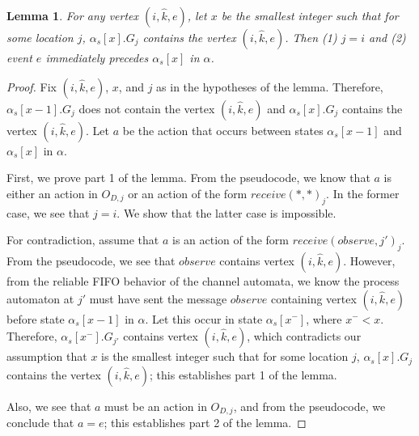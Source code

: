 \documentclass[11pt]{article}
\numberwithin{theorem}{section}
\newtheorem{lemma}[theorem]{Lemma}
\begin{document}
\begin{lemma}
\label{lem:vertexFirstAtHomeLocation}
For any vertex $(i,\hat{k},e)$, let $x$ be the smallest integer such that
for some location $j$, $\alpha_s[x].G_j$ contains the vertex
$(i,\hat{k},e)$. Then (1) $j=i$ and (2) event $e$ immediately precedes $\alpha_s[x]$ in $\alpha$.
\end{lemma} 

\begin{proof}
Fix $(i,\hat{k},e)$, $x$, and $j$ as in the hypotheses of the lemma. Therefore,
$\alpha_s[x-1].G_j$ does not contain the vertex $(i,\hat{k},e)$ and
$\alpha_s[x].G_j$ contains the vertex $(i,\hat{k},e)$. Let $a$ be the action
that occurs between states $\alpha_s[x-1]$ and $\alpha_s[x]$ in
$\alpha$.

First, we prove part 1 of the lemma.
From the pseudocode, we know that $a$ is either an action in $O_{D,j}$
or an action of the form $receive(*,*)_{j}$. In the former case, we
see that $j=i$. We show that the latter case is impossible.

For contradiction, assume that $a$ is an action of the form
$receive(observe,j')_j$. From the pseudocode, we see that $observe$
contains vertex $(i,\hat{k},e)$. However, from the reliable FIFO behavior of
the channel automata, we know the process automaton at $j'$ must have
sent the message $observe$ containing vertex $(i,\hat{k},e)$ before state
$\alpha_s[x-1]$ in $\alpha$. Let this occur in state $\alpha_s[x^-]$,
where $x^- < x$. Therefore, $\alpha_s[x^-].G_{j'}$ contains vertex
$(i,\hat{k},e)$, which contradicts our assumption that $x$ is the smallest
integer such that for some location $j$, $\alpha_s[x].G_j$ contains
the vertex $(i,\hat{k},e)$; this establishes part 1 of the lemma. 

Also, we see 
that $a$ must be an action in $O_{D,j}$, and from the pseudocode,
we conclude that $a = e$; this establishes part 2 of the lemma.
\end{proof}
\end{document}
